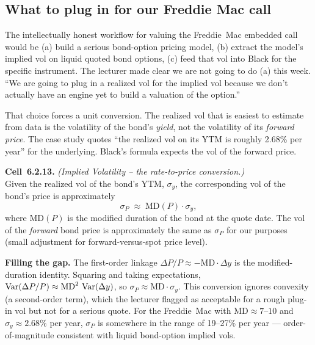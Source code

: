\subsection{What to plug in for our Freddie Mac call}\label{L5-sec:ivol-plug}

The intellectually honest workflow for valuing the Freddie~Mac
embedded call would be (a) build a serious bond-option pricing model,
(b) extract the model's implied vol on liquid quoted bond options, (c)
feed that vol into Black for the specific instrument. The lecturer
made clear we are not going to do (a) this week. ``We are going to
plug in a realized vol for the implied vol because we don't actually
have an engine yet to build a valuation of the option.''

That choice forces a unit conversion. The realized vol that is easiest
to estimate from data is the volatility of the bond's \emph{yield},
not the volatility of its \emph{forward price}. The case study quotes
``the realized vol on its YTM is roughly 2.68\% per year'' for the
underlying. Black's formula expects the vol of the forward price.

\begin{keyblock}
\textbf{Cell~6.2.13.} \emph{(Implied Volatility -- the rate-to-price
conversion.)}\\
Given the realized vol of the bond's YTM, $\sigma_y$, the corresponding
vol of the bond's price is approximately
\[
  \sigma_P \;\approx\; \mathrm{MD}(P) \cdot \sigma_y,
\]
where $\mathrm{MD}(P)$ is the modified duration of the bond at the
quote date. The vol of the \emph{forward} bond price is approximately
the same as $\sigma_P$ for our purposes (small adjustment for
forward-versus-spot price level).
\end{keyblock}

\begin{tipblock}
\textbf{Filling the gap.} The first-order linkage
$\Delta P / P \approx -\mathrm{MD} \cdot \Delta y$ is the modified-duration
identity. Squaring and taking expectations,
$\operatorname{Var}(\Delta P / P) \approx \mathrm{MD}^2 \, \operatorname{Var}(\Delta y)$, so
$\sigma_P \approx \mathrm{MD} \cdot \sigma_y$. This conversion ignores
convexity (a second-order term), which the lecturer flagged as
acceptable for a rough plug-in vol but not for a serious quote.
For the Freddie~Mac with $\mathrm{MD} \approx 7$--$10$ and
$\sigma_y \approx 2.68\%$ per year, $\sigma_P$ is somewhere in the
range of 19--27\% per year --- order-of-magnitude consistent with
liquid bond-option implied vols.
\end{tipblock}

